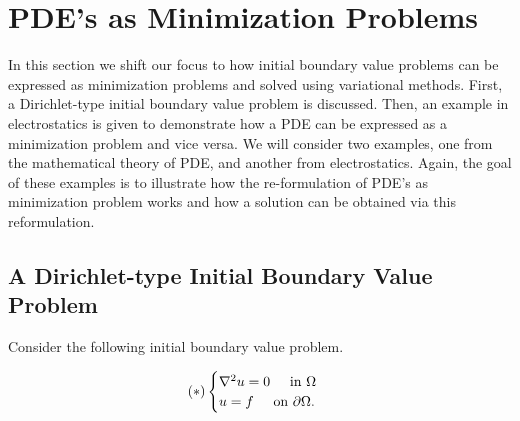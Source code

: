 \documentclass{article}
\newcommand{\p}{\partial}
\begin{document}
\section{PDE's as Minimization Problems}

In this section we shift our focus to how initial boundary value problems can be expressed as minimization problems and solved using variational methods. First, a Dirichlet-type initial boundary value problem is discussed. Then, an example in electrostatics is given to demonstrate how a PDE can be expressed as a minimization problem and vice versa. We will consider two examples, one from the mathematical theory of PDE, and another from electrostatics. Again, the goal of these examples is to illustrate how the re-formulation of PDE's as minimization problem works and how a solution can be obtained via this reformulation. 

\subsection{A Dirichlet-type Initial Boundary Value Problem}

Consider the following initial boundary value problem. 

\begin{align}
(\ast) \begin{cases}
\nabla^2 u = 0 \hspace{0.5cm} \text{in $\Omega$}\\
u = f \hspace{0.5cm} \text{on $\p\Omega$}.
\end{cases}
\end{align}
\end{document}
